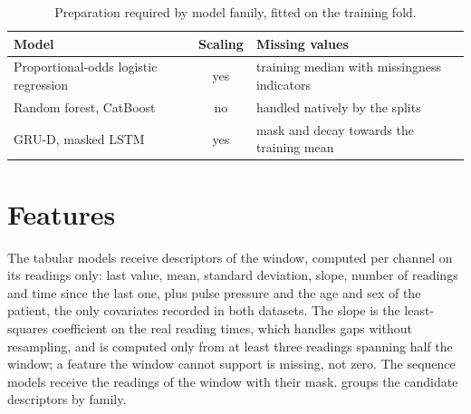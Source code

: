 \documentclass[11pt,a4paper,oneside]{report}
\begin{document}
\begin{table}[htbp]
\centering\footnotesize
\caption{Preparation required by model family, fitted on the training fold.}\label{tab:model-prep}
\begin{tabularx}{\textwidth}{@{}X c X@{}}
\toprule
\textbf{Model} & \textbf{Scaling} & \textbf{Missing values} \\
\midrule
Proportional-odds logistic regression & yes & training median with missingness indicators \\
Random forest, CatBoost & no & handled natively by the splits \\
GRU-D, masked LSTM & yes & mask and decay towards the training mean \\
\bottomrule
\end{tabularx}
\end{table}

\section{Features}\label{sec:feature-eng}\label{sec:features}\label{sec:budget}

The tabular models receive descriptors of the window, computed per channel on its readings only: last value, mean, standard deviation, slope, number of readings and time since the last one, plus pulse pressure and the age and sex of the patient, the only covariates recorded in both datasets. The slope is the least-squares coefficient on the real reading times, which handles gaps without resampling, and is computed only from at least three readings spanning half the window; a feature the window cannot support is missing, not zero. The sequence models receive the readings of the window with their mask.  groups the candidate descriptors by family.
\end{document}

